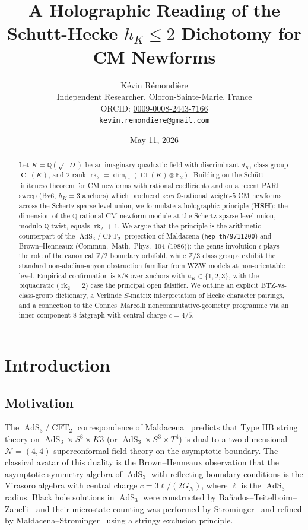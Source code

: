\documentclass[11pt,a4paper]{amsart}
\title[Holographic Schutt-Hecke dichotomy]{A Holographic Reading of the Schutt-Hecke $h_K \le 2$ Dichotomy for CM Newforms}
\author[K. R\'emondi\`ere]{K\'evin R\'emondi\`ere\\
\small Independent Researcher, Oloron-Sainte-Marie, France\\
\small ORCID: \href{https://orcid.org/0009-0008-2443-7166}{0009-0008-2443-7166}\\
\small \texttt{kevin.remondiere@gmail.com}}
\date{May 11, 2026}
\theoremstyle{definition}
\DeclareMathOperator{\Cl}{Cl}
\DeclareMathOperator{\rk}{rk}
\DeclareMathOperator{\AdS}{AdS}
\DeclareMathOperator{\CFT}{CFT}
\newcommand{\Q}{\mathbb{Q}}
\newcommand{\Z}{\mathbb{Z}}
\newcommand{\F}{\mathbb{F}}
\newcommand{\Ncal}{\mathcal{N}}
\newcommand{\rktwo}{\rk_{2}}
\begin{document}
\begin{abstract}
Let $K = \Q(\sqrt{-D})$ be an imaginary quadratic field with discriminant $d_K$, class
group $\Cl(K)$, and $2$-rank $\rktwo = \dim_{\F_2}(\Cl(K)\otimes\F_2)$. Building on the
Sch\"utt finiteness theorem for CM newforms with rational coefficients and on a recent
PARI sweep (Bv6, $h_K = 3$ anchors) which produced \emph{zero} $\Q$-rational weight-$5$
CM newforms across the Schertz-sparse level union, we formulate a holographic principle
(\textbf{HSH}): the dimension of the $\Q$-rational CM newform module at the Schertz-sparse
level union, modulo $\Q$-twist, equals $\rktwo+1$. We argue that the principle is the
arithmetic counterpart of the $\AdS_3/\CFT_2$ projection of Maldacena
(\texttt{hep-th/9711200}) and Brown--Henneaux (Commun.\ Math.\ Phys.\ 104 (1986)):
the genus involution $\iota$ plays the role of the canonical $\Z/2$ boundary orbifold,
while $\Z/3$ class groups exhibit the standard non-abelian-anyon obstruction familiar
from WZW models at non-orientable level. Empirical confirmation is $8/8$ over anchors
with $h_K \in \{1,2,3\}$, with the biquadratic ($\rktwo = 2$) case the principal
open falsifier. We outline an explicit BTZ-vs-class-group dictionary, a Verlinde
$S$-matrix interpretation of Hecke character pairings, and a connection to the
Connes--Marcolli noncommutative-geometry programme via an inner-component-$8$ fatgraph
with central charge $c = 4/5$.
\end{abstract}

\maketitle

\section{Introduction}\label{sec:intro}

\subsection{Motivation}\label{ss:intro-mot}

The $\AdS_3/\CFT_2$ correspondence of Maldacena~\cite{Maldacena1997} predicts that
Type IIB string theory on $\AdS_3 \times S^3 \times K3$ (or $\AdS_3 \times S^3 \times T^4$)
is dual to a two-dimensional $\Ncal=(4,4)$ superconformal field theory on the asymptotic
boundary. The classical avatar of this duality is the Brown--Henneaux observation
\cite{BrownHenneaux1986} that the asymptotic symmetry algebra of $\AdS_3$ with
reflecting boundary conditions is the Virasoro algebra with central charge
$c = 3\ell/(2G_N)$, where $\ell$ is the $\AdS_3$ radius. Black hole solutions in
$\AdS_3$ were constructed by Ba\~nados--Teitelboim--Zanelli~\cite{BTZ1992} and their
microstate counting was performed by Strominger~\cite{Strominger1998} and refined by
Maldacena--Strominger~\cite{MaldacenaStrominger1998} using a stringy exclusion principle.
\end{document}
